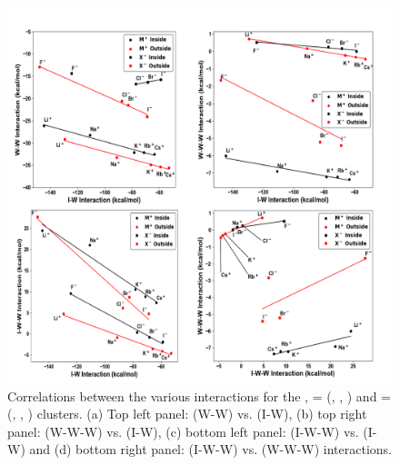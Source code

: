 \begin{figure}[t]
    \centering
    \begin{adjustbox}{max size={.6\textwidth}{.6\textheight}}
    \includegraphics[width=\textwidth]{Figures/Chapter_3/figure_9_combined.png}
    \end{adjustbox}
    \begin{spacing}{1.0}
  \caption[Correlations between the various interactions for the ,  =  (, , ) and  =  (, , ) clusters. (a) Top left panel: (W-W) vs. (I-W), (b) top right panel: (W-W-W) vs. (I-W), (c) bottom left panel: (I-W-W) vs. (I-W) and (d) bottom right panel: (I-W-W) vs. (W-W-W) interactions.]{Correlations between the various interactions for the ,  =  (, , ) and  =  (, , ) clusters. (a) Top left panel: (W-W) vs. (I-W), (b) top right panel: (W-W-W) vs. (I-W), (c) bottom left panel: (I-W-W) vs. (I-W) and (d) bottom right panel: (I-W-W) vs. (W-W-W) interactions.}\label{fig:MBE_II_9}
  \end{spacing}
\end{figure}